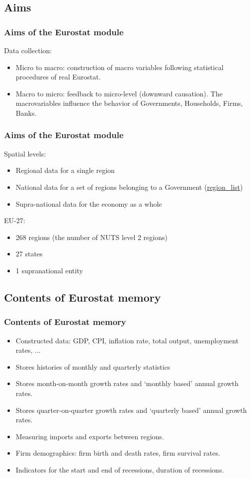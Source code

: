 \documentclass{beamer}
\begin{document}
\subsection{Aims}
\begin{frame}{}
\frametitle{Aims of the Eurostat module}
Data collection:
\begin{itemize}
\item Micro to macro: construction of macro variables following statistical procedures of real Eurostat.
\item Macro to micro: feedback to micro-level (downward causation). The macrovariables influence the behavior of Governments, Households, Firms, Banks.
\end{itemize}
\end{frame}

\begin{frame}{}
\frametitle{Aims of the Eurostat module}
Spatial levels:
\begin{itemize}
\item Regional data for a single region
\item National data for a set of regions belonging to a Government (\url{region_list})
\item Supra-national data for the economy as a whole
\end{itemize}

EU-27:
\begin{itemize}
\item 268 regions (the number of NUTS level 2 regions)
\item 27 states
\item 1 supranational entity
\end{itemize}
\end{frame}

\subsection{Contents of Eurostat memory}
\begin{frame}{}
\frametitle{Contents of Eurostat memory}
\begin{itemize}
    \item Constructed data: GDP, CPI, inflation rate, total output, unemployment rates, ...
    \item Stores histories of monthly and quarterly statistics
    \item Stores month-on-month growth rates and `monthly based' annual growth rates.
    \item Stores quarter-on-quarter growth rates and `quarterly based' annual growth rates.
    \item Measuring imports and exports between regions.
    \item Firm demographics: firm birth and death rates, firm survival rates.
    \item Indicators for the start and end of recessions, duration of recessions.
\end{itemize}    
\end{frame}
\end{document}
